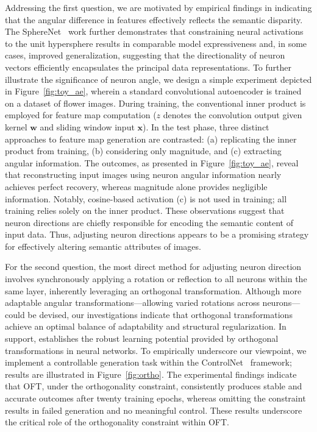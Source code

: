Addressing the first question, we are motivated by empirical findings in \cite{liu2018decoupled,chen2020angular} indicating that the angular difference in features effectively reflects the semantic disparity. The SphereNet~\cite{liu2017deep} work further demonstrates that constraining neural activations to the unit hypersphere results in comparable model expressiveness and, in some cases, improved generalization, suggesting that the directionality of neuron vectors efficiently encapsulates the principal data representations. To further illustrate the significance of neuron angle, we design a simple experiment depicted in Figure~\ref{fig:toy_ae}, wherein a standard convolutional autoencoder is trained on a dataset of flower images. During training, the conventional inner product is employed for feature map computation ($z$ denotes the convolution output given kernel $\bm{w}$ and sliding window input $\bm{x}$). In the test phase, three distinct approaches to feature map generation are contrasted: (a) replicating the inner product from training, (b) considering only magnitude, and (c) extracting angular information. The outcomes, as presented in Figure~\ref{fig:toy_ae}, reveal that reconstructing input images using neuron angular information nearly achieves perfect recovery, whereas magnitude alone provides negligible information. Notably, cosine-based activation (c) is not used in training; all training relies solely on the inner product. These observations suggest that neuron directions are chiefly responsible for encoding the semantic content of input data. Thus, adjusting neuron directions appears to be a promising strategy for effectively altering semantic attributes of images.

For the second question, the most direct method for adjusting neuron direction involves synchronously applying a rotation or reflection to all neurons within the same layer, inherently leveraging an orthogonal transformation. Although more adaptable angular transformations—allowing varied rotations across neurons—could be devised, our investigations indicate that orthogonal transformations achieve an optimal balance of adaptability and structural regularization. In support, \cite{liu2021orthogonal} establishes the robust learning potential provided by orthogonal transformations in neural networks. To empirically underscore our viewpoint, we implement a controllable generation task within the ControlNet~\cite{zhang2023adding} framework; results are illustrated in Figure~\ref{fig:ortho}. The experimental findings indicate that OFT, under the orthogonality constraint, consistently produces stable and accurate outcomes after twenty training epochs, whereas omitting the constraint results in failed generation and no meaningful control. These results underscore the critical role of the orthogonality constraint within OFT.

